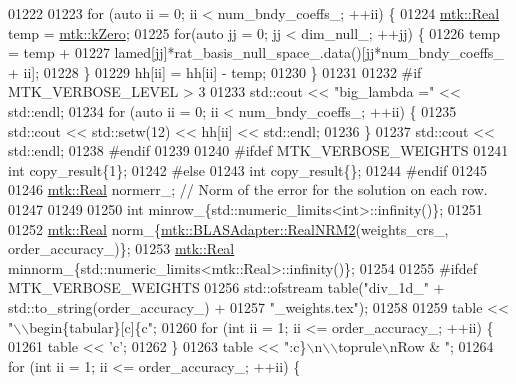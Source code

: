 \begin{DoxyCode}
{{01222 
01223     \textcolor{keywordflow}{for} (\textcolor{keyword}{auto} ii = 0; ii < num\_bndy\_coeffs\_; ++ii) \{
01224       \hyperlink{group__c01-roots_gac080bbbf5cbb5502c9f00405f894857d}{mtk::Real} temp = \hyperlink{group__c01-roots_ga59a451a5fae30d59649bcda274fea271}{mtk::kZero};
01225       \textcolor{keywordflow}{for}(\textcolor{keyword}{auto} jj = 0; jj < dim\_null\_; ++jj) \{
01226         temp = temp +
01227           lamed[jj]*rat\_basis\_null\_space\_.data()[jj*num\_bndy\_coeffs\_ + ii];
01228       \}
01229       hh[ii] = hh[ii] - temp;
01230     \}
01231 
01232 \textcolor{preprocessor}{    #if MTK\_VERBOSE\_LEVEL > 3}
01233     std::cout << \textcolor{stringliteral}{"big\_lambda ="} << std::endl;
01234     \textcolor{keywordflow}{for} (\textcolor{keyword}{auto} ii = 0; ii < num\_bndy\_coeffs\_; ++ii) \{
01235       std::cout << std::setw(12) << hh[ii] << std::endl;
01236     \}
01237     std::cout << std::endl;
01238 \textcolor{preprocessor}{    #endif}
01239 
01240 \textcolor{preprocessor}{    #ifdef MTK\_VERBOSE\_WEIGHTS}
01241     \textcolor{keywordtype}{int} copy\_result\{1\};
01242 \textcolor{preprocessor}{    #else}
01243     \textcolor{keywordtype}{int} copy\_result\{\};
01244 \textcolor{preprocessor}{    #endif}
01245 
01246     \hyperlink{group__c01-roots_gac080bbbf5cbb5502c9f00405f894857d}{mtk::Real} normerr\_; \textcolor{comment}{// Norm of the error for the solution on each row.}
01247 
01249 
01250     \textcolor{keywordtype}{int} minrow\_\{std::numeric\_limits<int>::infinity()\};
01251 
01252     \hyperlink{group__c01-roots_gac080bbbf5cbb5502c9f00405f894857d}{mtk::Real} norm\_\{\hyperlink{classmtk_1_1BLASAdapter_ab92440888b730863244c5d9479c11aca}{mtk::BLASAdapter::RealNRM2}(weights\_crs\_,
      order\_accuracy\_)\};
01253     \hyperlink{group__c01-roots_gac080bbbf5cbb5502c9f00405f894857d}{mtk::Real} minnorm\_\{std::numeric\_limits<mtk::Real>::infinity()\};
01254 
01255 \textcolor{preprocessor}{    #ifdef MTK\_VERBOSE\_WEIGHTS}
01256     std::ofstream table(\textcolor{stringliteral}{"div\_1d\_"} + std::to\_string(order\_accuracy\_) +
01257       \textcolor{stringliteral}{"\_weights.tex"});
01258 
01259     table << \textcolor{stringliteral}{"\(\backslash\)\(\backslash\)begin\{tabular\}[c]\{c"};
01260     \textcolor{keywordflow}{for} (\textcolor{keywordtype}{int} ii = 1; ii <= order\_accuracy\_; ++ii) \{
01261       table << \textcolor{charliteral}{'c'};
01262     \}
01263     table << \textcolor{stringliteral}{":c\}\(\backslash\)n\(\backslash\)\(\backslash\)toprule\(\backslash\)nRow & "};
01264     \textcolor{keywordflow}{for} (\textcolor{keywordtype}{int} ii = 1; ii <= order\_accuracy\_; ++ii) \{
}}
\end{DoxyCode}
